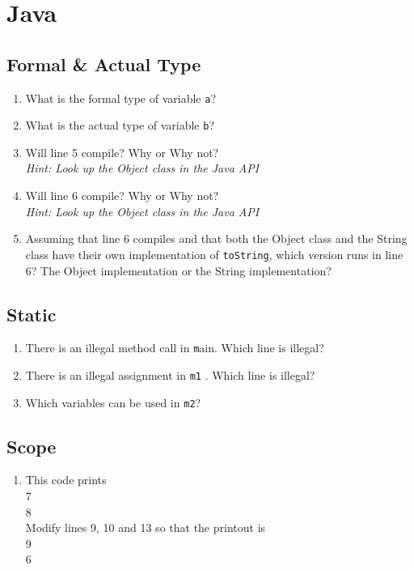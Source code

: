 \documentclass{article}
\begin{document}
\newcommand{\var}[1]{\texttt{#1}}
\newcommand{\java}[1]{}
\section{Java}
	\subsection{Formal \& Actual Type}
		
	\begin{enumerate}
		\item What is the formal type of variable \var a?
		\item What is the actual type of variable \var b?
		\item Will line 5 compile? Why or Why not? \\ \emph{Hint: Look up the Object
		class in the Java API}
		\item Will line 6 compile? Why or Why not? \\ \emph{Hint: Look
		up the Object class in the Java API}
		\item Assuming that line 6 compiles and that both the Object class
		and the String class have their own implementation of
		\var{toString}, which version runs in line 6? The
		Object implementation or the String implementation?
	\end{enumerate}

	\subsection{Static}
	\java{q2.java}
	\begin{enumerate}
		\item There is an illegal method call in \var main. Which line
		is illegal?
		\item There is an illegal assignment in \var{m1} . Which line is
		illegal?
		\item Which variables can be used in \var{m2}?
	\end{enumerate}

	\subsection{Scope}
	\java{q3.java}
	\begin{enumerate}
		\item This code prints \\ 7 \\ 8 \\ Modify lines 9, 10 and 13 so that the printout is \\ 9 \\ 6
	\end{enumerate}
\end{document}
